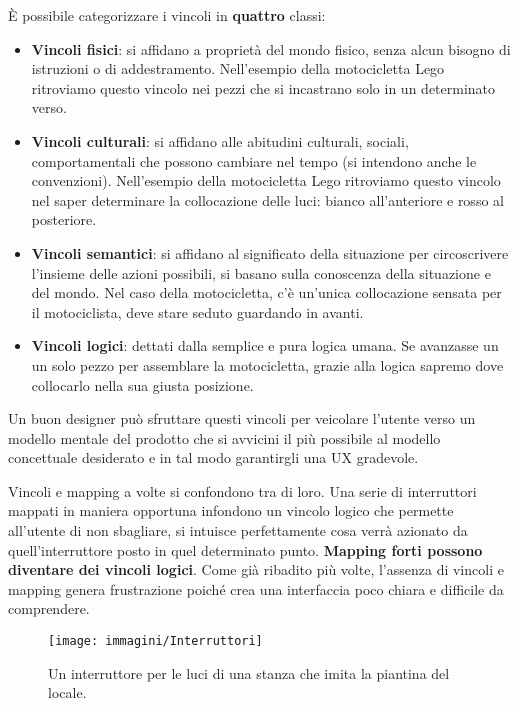 È possibile categorizzare i vincoli in \textbf{quattro} classi:
\begin{itemize}
	\itemsep-0.3em
	\item \textbf{Vincoli fisici}: si affidano a proprietà del mondo fisico, senza alcun bisogno di istruzioni o di addestramento. Nell'esempio della
	motocicletta Lego ritroviamo questo vincolo nei pezzi che si incastrano solo in un determinato verso.
	\item \textbf{Vincoli culturali}: si affidano alle abitudini culturali, sociali, comportamentali che possono cambiare nel tempo (si intendono
	anche le convenzioni). Nell'esempio della motocicletta Lego ritroviamo questo vincolo nel saper determinare la collocazione delle
	luci: bianco all'anteriore e rosso al posteriore.
	\item \textbf{Vincoli semantici}: si affidano al significato della situazione per circoscrivere l'insieme delle azioni possibili, si basano sulla
	conoscenza della situazione e del mondo. Nel caso della motocicletta, c'è un'unica collocazione sensata per il motociclista, deve stare seduto
	guardando in avanti.
	\item \textbf{Vincoli logici}: dettati dalla semplice e pura logica umana. Se avanzasse un un solo pezzo per assemblare la motocicletta, grazie alla
	logica sapremo dove collocarlo nella sua giusta posizione.
\end{itemize}

Un buon designer può sfruttare questi vincoli per veicolare l'utente verso un modello mentale del prodotto che si avvicini il più possibile al modello
concettuale desiderato e in tal modo garantirgli una UX gradevole.

Vincoli e mapping a volte si confondono tra di loro. Una serie di interruttori mappati in maniera opportuna infondono un vincolo logico che permette
all'utente di non sbagliare, si intuisce perfettamente cosa verrà azionato da quell'interruttore posto in quel determinato punto. \textbf{Mapping forti
possono diventare dei vincoli logici}.
Come già ribadito più volte, l'assenza di vincoli e mapping genera frustrazione poiché crea una interfaccia poco chiara e difficile da comprendere.
\begin{figure}[!h]
	\centering
	\texttt{[image: immagini/Interruttori]}
	\caption{Un interruttore per le luci di una stanza che imita la piantina del locale.}
\end{figure}

